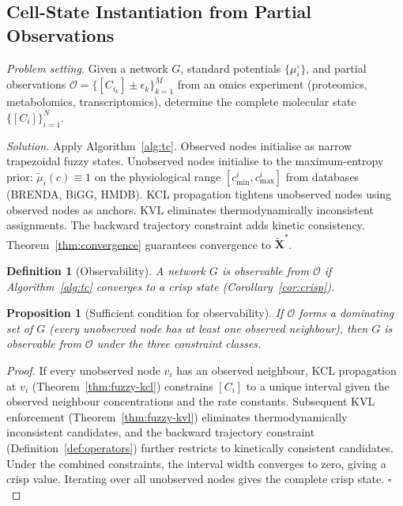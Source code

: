 \documentclass[twocolumn,10pt,a4paper]{article}
\newtheorem{proposition}[theorem]{Proposition}
\newtheorem{definition}[theorem]{Definition}
\begin{document}
\subsection{Cell-State Instantiation from Partial Observations}
\label{sec:app-instantiation}

\emph{Problem setting.}  Given a network $G$, standard potentials
$\{\mu_i^\circ\}$, and partial observations
$\mathcal{O}=\{[C_{i_k}]\pm\epsilon_k\}_{k=1}^M$ from an omics experiment
(proteomics, metabolomics, transcriptomics), determine the complete molecular
state $\{[C_i]\}_{i=1}^N$.

\emph{Solution.}  Apply Algorithm~\ref{alg:tc}.  Observed nodes initialise
as narrow trapezoidal fuzzy states.  Unobserved nodes initialise to the
maximum-entropy prior: $\tilde{\mu}_i(c)\equiv 1$ on the physiological range
$[c_{\min}^i,c_{\max}^i]$ from databases (BRENDA, BiGG, HMDB).  KCL
propagation tightens unobserved nodes using observed nodes as anchors.  KVL
eliminates thermodynamically inconsistent assignments.  The backward trajectory
constraint adds kinetic consistency.  Theorem~\ref{thm:convergence} guarantees
convergence to $\widetilde{\mathbf{X}}^*$.

\begin{definition}[Observability]
\label{def:observability}
A network $G$ is \emph{observable} from $\mathcal{O}$ if
Algorithm~\ref{alg:tc} converges to a crisp state (Corollary~\ref{cor:crisp}).
\end{definition}

\begin{proposition}[Sufficient condition for observability]
\label{prop:observability}
If $\mathcal{O}$ forms a dominating set of $G$ (every unobserved node has at
least one observed neighbour), then $G$ is observable from $\mathcal{O}$
under the three constraint classes.
\end{proposition}

\begin{proof}
If every unobserved node $v_i$ has an observed neighbour, KCL propagation at
$v_i$ (Theorem~\ref{thm:fuzzy-kcl}) constrains $[C_i]$ to a unique interval
given the observed neighbour concentrations and the rate constants.  Subsequent
KVL enforcement (Theorem~\ref{thm:fuzzy-kvl}) eliminates thermodynamically
inconsistent candidates, and the backward trajectory constraint (Definition~\ref{def:operators})
further restricts to kinetically consistent candidates.  Under the combined
constraints, the interval width converges to zero, giving a crisp value.
Iterating over all unobserved nodes gives the complete crisp state.  $\square$
\end{proof}
\end{document}
